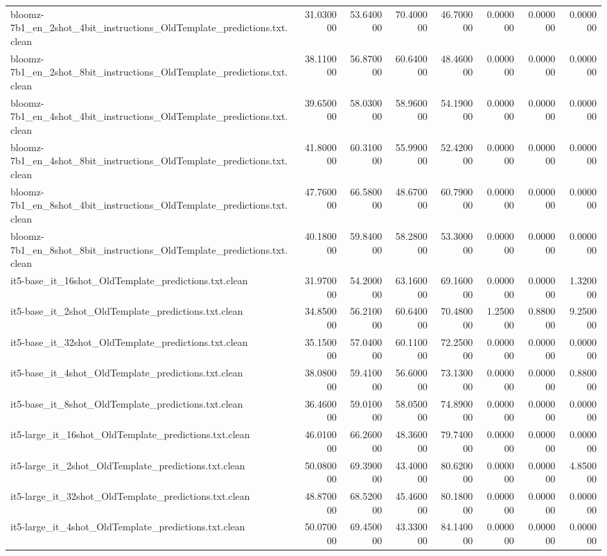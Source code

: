 \begin{tabular}{lrrrrrrr}
bloomz-7b1_en_2shot_4bit_instructions_OldTemplate_predictions.txt.clean & 31.030000 & 53.640000 & 70.400000 & 46.700000 & 0.000000 & 0.000000 & 0.000000 \\
bloomz-7b1_en_2shot_8bit_instructions_OldTemplate_predictions.txt.clean & 38.110000 & 56.870000 & 60.640000 & 48.460000 & 0.000000 & 0.000000 & 0.000000 \\
bloomz-7b1_en_4shot_4bit_instructions_OldTemplate_predictions.txt.clean & 39.650000 & 58.030000 & 58.960000 & 54.190000 & 0.000000 & 0.000000 & 0.000000 \\
bloomz-7b1_en_4shot_8bit_instructions_OldTemplate_predictions.txt.clean & 41.800000 & 60.310000 & 55.990000 & 52.420000 & 0.000000 & 0.000000 & 0.000000 \\
bloomz-7b1_en_8shot_4bit_instructions_OldTemplate_predictions.txt.clean & 47.760000 & 66.580000 & 48.670000 & 60.790000 & 0.000000 & 0.000000 & 0.000000 \\
bloomz-7b1_en_8shot_8bit_instructions_OldTemplate_predictions.txt.clean & 40.180000 & 59.840000 & 58.280000 & 53.300000 & 0.000000 & 0.000000 & 0.000000 \\
it5-base_it_16shot_OldTemplate_predictions.txt.clean & 31.970000 & 54.200000 & 63.160000 & 69.160000 & 0.000000 & 0.000000 & 1.320000 \\
it5-base_it_2shot_OldTemplate_predictions.txt.clean & 34.850000 & 56.210000 & 60.640000 & 70.480000 & 1.250000 & 0.880000 & 9.250000 \\
it5-base_it_32shot_OldTemplate_predictions.txt.clean & 35.150000 & 57.040000 & 60.110000 & 72.250000 & 0.000000 & 0.000000 & 0.000000 \\
it5-base_it_4shot_OldTemplate_predictions.txt.clean & 38.080000 & 59.410000 & 56.600000 & 73.130000 & 0.000000 & 0.000000 & 0.880000 \\
it5-base_it_8shot_OldTemplate_predictions.txt.clean & 36.460000 & 59.010000 & 58.050000 & 74.890000 & 0.000000 & 0.000000 & 0.000000 \\
it5-large_it_16shot_OldTemplate_predictions.txt.clean & 46.010000 & 66.260000 & 48.360000 & 79.740000 & 0.000000 & 0.000000 & 0.000000 \\
it5-large_it_2shot_OldTemplate_predictions.txt.clean & 50.080000 & 69.390000 & 43.400000 & 80.620000 & 0.000000 & 0.000000 & 4.850000 \\
it5-large_it_32shot_OldTemplate_predictions.txt.clean & 48.870000 & 68.520000 & 45.460000 & 80.180000 & 0.000000 & 0.000000 & 0.000000 \\
it5-large_it_4shot_OldTemplate_predictions.txt.clean & 50.070000 & 69.450000 & 43.330000 & 84.140000 & 0.000000 & 0.000000 & 0.000000 \\

\end{tabular}
